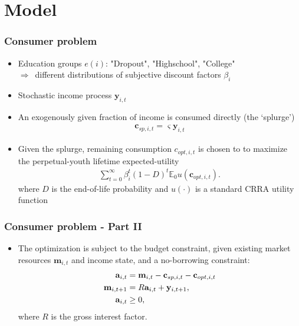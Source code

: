 \documentclass[pdflatex,aspectratio=169]{beamer}
\newcommand{\ra}{\ensuremath{\Rightarrow}}
\begin{document}
\section{Model}

\begin{frame}
\frametitle{Consumer problem}
\begin{itemize}
	\itemsep = .5\bigskipamount 
	\item Education groups $e(i)$: "Dropout", "Highschool", "College" \\[1ex] 
	\ra\ different distributions of subjective discount factors $\beta_i$
	\item Stochastic income process $\mathbf{y}_{i,t}$
	\item An exogenously given fraction of income is consumed directly (the `splurge')
		\begin{align}
		\mathbf{c}_{sp,i,t} = \varsigma \mathbf{y}_{i,t}
		\end{align}
	\item Given the splurge, remaining consumption $c_{opt,i,t}$ is chosen to to maximize the perpetual-youth lifetime expected-utility
		\begin{align}
		\sum_{t=0}^{\infty}\beta_i^t (1-D)^t \mathbb{E}_0 u(\mathbf{c}_{opt,i,t}).
		\end{align}
		where $D$ is the end-of-life probability and $u(\cdot)$ is a standard CRRA utility function	
\end{itemize}
\end{frame}

\begin{frame}
\frametitle{Consumer problem - Part II}

	\begin{itemize}
		\item The optimization is subject to the budget constraint, given existing market resources $\mathbf{m}_{i,t}$ and income state, and a no-borrowing constraint: 
		\begin{align}
		\mathbf{a}_{i,t} &= \mathbf{m}_{i,t} - \mathbf{c}_{sp,i,t} - \mathbf{c}_{opt,i,t} \\
		\mathbf{m}_{i,t+1} &= R \mathbf{a}_{i,t} + \mathbf{y}_{i,t+1}, \\
		\mathbf{a}_{i,t} &\geq 0,   \notag
		\end{align}
		where $R$ is the gross interest factor.
	\end{itemize}



\end{frame}
\end{document}
